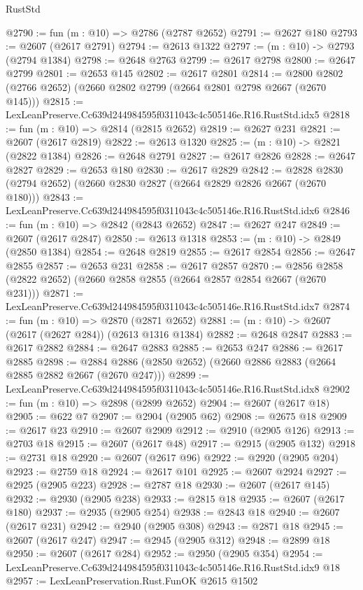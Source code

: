 \begin{lexlean}{RustStd}
\begin{coremodule}
@2790 := fun (m : @10) => @2786 (@2787 @2652)
@2791 := @2627 @180
@2793 := @2607 (@2617 @2791)
@2794 := @2613 @1322
@2797 := (m : @10) -> @2793 (@2794 @1384)
@2798 := @2648 @2763
@2799 := @2617 @2798
@2800 := @2647 @2799
@2801 := @2653 @145
@2802 := @2617 @2801
@2814 := @2800 @2802 (@2766 @2652) (@2660 @2802 @2799 (@2664 @2801 @2798 @2667 (@2670 @145)))
@2815 := LexLeanPreserve.Cc639d244984595f0311043c4c505146e.R16.RustStd.idx5
@2818 := fun (m : @10) => @2814 (@2815 @2652)
@2819 := @2627 @231
@2821 := @2607 (@2617 @2819)
@2822 := @2613 @1320
@2825 := (m : @10) -> @2821 (@2822 @1384)
@2826 := @2648 @2791
@2827 := @2617 @2826
@2828 := @2647 @2827
@2829 := @2653 @180
@2830 := @2617 @2829
@2842 := @2828 @2830 (@2794 @2652) (@2660 @2830 @2827 (@2664 @2829 @2826 @2667 (@2670 @180)))
@2843 := LexLeanPreserve.Cc639d244984595f0311043c4c505146e.R16.RustStd.idx6
@2846 := fun (m : @10) => @2842 (@2843 @2652)
@2847 := @2627 @247
@2849 := @2607 (@2617 @2847)
@2850 := @2613 @1318
@2853 := (m : @10) -> @2849 (@2850 @1384)
@2854 := @2648 @2819
@2855 := @2617 @2854
@2856 := @2647 @2855
@2857 := @2653 @231
@2858 := @2617 @2857
@2870 := @2856 @2858 (@2822 @2652) (@2660 @2858 @2855 (@2664 @2857 @2854 @2667 (@2670 @231)))
@2871 := LexLeanPreserve.Cc639d244984595f0311043c4c505146e.R16.RustStd.idx7
@2874 := fun (m : @10) => @2870 (@2871 @2652)
@2881 := (m : @10) -> @2607 (@2617 (@2627 @284)) (@2613 @1316 @1384)
@2882 := @2648 @2847
@2883 := @2617 @2882
@2884 := @2647 @2883
@2885 := @2653 @247
@2886 := @2617 @2885
@2898 := @2884 @2886 (@2850 @2652) (@2660 @2886 @2883 (@2664 @2885 @2882 @2667 (@2670 @247)))
@2899 := LexLeanPreserve.Cc639d244984595f0311043c4c505146e.R16.RustStd.idx8
@2902 := fun (m : @10) => @2898 (@2899 @2652)
@2904 := @2607 (@2617 @18)
@2905 := @622 @7
@2907 := @2904 (@2905 @62)
@2908 := @2675 @18
@2909 := @2617 @23
@2910 := @2607 @2909
@2912 := @2910 (@2905 @126)
@2913 := @2703 @18
@2915 := @2607 (@2617 @48)
@2917 := @2915 (@2905 @132)
@2918 := @2731 @18
@2920 := @2607 (@2617 @96)
@2922 := @2920 (@2905 @204)
@2923 := @2759 @18
@2924 := @2617 @101
@2925 := @2607 @2924
@2927 := @2925 (@2905 @223)
@2928 := @2787 @18
@2930 := @2607 (@2617 @145)
@2932 := @2930 (@2905 @238)
@2933 := @2815 @18
@2935 := @2607 (@2617 @180)
@2937 := @2935 (@2905 @254)
@2938 := @2843 @18
@2940 := @2607 (@2617 @231)
@2942 := @2940 (@2905 @308)
@2943 := @2871 @18
@2945 := @2607 (@2617 @247)
@2947 := @2945 (@2905 @312)
@2948 := @2899 @18
@2950 := @2607 (@2617 @284)
@2952 := @2950 (@2905 @354)
@2954 := LexLeanPreserve.Cc639d244984595f0311043c4c505146e.R16.RustStd.idx9 @18
@2957 := LexLeanPreservation.Rust.FunOK @2615 @1502

\end{coremodule}
\end{lexlean}
